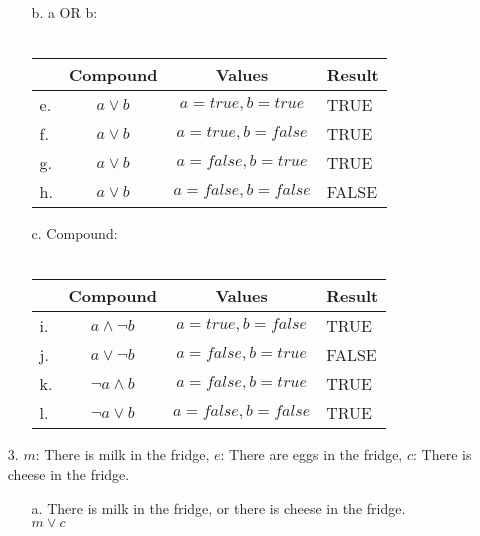 \begin{enumerate}
\begin{itemize}
                \item[b.]   a OR b: ~\\~\\
                    \begin{tabular}{ | l  c | c | p{6cm} | }
                        \hline
                        & \textbf{Compound} & \textbf{Values} & \textbf{Result}
                        \\ \hline

                        e. &        $a \lor b$ &       $a = true, b = true$ &   TRUE  \\ \hline
                        f. &        $a \lor b$ &       $a = true, b = false$ &  TRUE  \\ \hline
                        g. &        $a \lor b$ &       $a = false, b = true$ &  TRUE  \\ \hline
                        h. &        $a \lor b$ &       $a = false, b = false$ & FALSE  \\ \hline
                    \end{tabular}
                    
                \item[c.]   Compound: ~\\~\\
                    \begin{tabular}{ | l  c | c | p{6cm} | }
                        \hline
                        & \textbf{Compound} & \textbf{Values} & \textbf{Result}
                        \\ \hline

                        i. &        $a \land \neg b$ &       $a = true, b = false$ & TRUE  \\ \hline
                        j. &        $a \lor \neg b$ &        $a = false, b = true$ & FALSE  \\ \hline

                        k. &        $\neg a \land b$ &       $a = false, b = true$ & TRUE  \\ \hline
                        l. &        $\neg a \lor b$ &        $a = false, b = false$ & TRUE \\ \hline
                    \end{tabular}
            \end{itemize}
            

        \item[3.]   $m$: There is milk in the fridge, $e$: There are eggs in the fridge, $c$: There is cheese in the fridge.
            \begin{enumerate}
                \item[a.]   There is milk in the fridge, or there is cheese in the fridge. \\
                            $m \lor c$
                            

\end{enumerate}
\end{enumerate}
